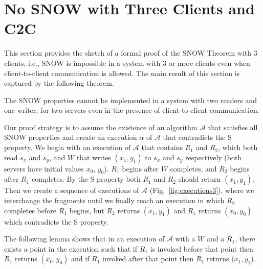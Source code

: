 \section{No SNOW with Three Clients and C2C}
\label{sec:formal_proof}
\sloppy This section provides the sketch of a formal proof of the SNOW Theorem with 3 clients, i.e., SNOW is impossible in a system with 3 or more clients even when client-to-client communication is allowed. The main result of this section is captured by the following theorem. 
\begin{theorem}\label{thm:snow3}
	The SNOW properties cannot be implemented in a system with two readers and one writer, for two servers even in the presence of client-to-client communication.
\end{theorem}

Our proof strategy is to assume the existence of an algorithm $\mathcal{A}$ that satisfies all SNOW properties and create an execution $\alpha$ of $\mathcal{A}$ that contradicts the S property. 
We begin with an execution of $\mathcal{A}$ that contains \rots{} $R_1$ and $R_2$, which both read $s_x$ and $s_y$, and \wot{} $W$ that writes $(x_1, y_1)$ to $s_x$ and $s_y$ respectively (both servers have initial values $x_0$, $y_0$). $R_1$ begins after $W$ completes, and $R_2$ begins after $R_1$ completes. By the S property both  $R_1$   and $R_2$ should return $(x_1, y_1)$.
Then we create a sequence of 
executions of $\mathcal{A}$  (Fig.~\ref{fig:executions3}), where we interchange the fragments until we  finally reach
 an execution in which $R_2$ completes before $R_1$ begins, but $R_2$ returns 
$(x_1, y_1)$ and $R_1$ returns $(x_0, y_0)$ which contradicts the  S property.

The following lemma shows that in an execution of $\mathcal{A}$ with a \wot{} $W$ and a \rot{} $R_1$, there exists a point  in the execution
such that if $R_1$ is invoked before that point then $R_1$ returns $(x_0, y_0)$ and if $R_1$ invoked after 
that point then $R_1$ returns $(x_1, y_1$).

